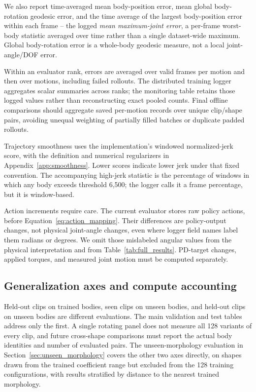 We also report time-averaged mean body-position error, mean global
body-rotation geodesic error, and the time average of the largest body-position
error within each frame -- the logged \emph{mean maximum-joint error}, a
per-frame worst-body statistic averaged over time rather than a single
dataset-wide maximum. Global body-rotation error is a whole-body geodesic
measure, not a local joint-angle/DOF error.

Within an evaluator rank, errors are averaged over valid frames per motion
and then over motions, including failed rollouts. The distributed training
logger aggregates scalar summaries across ranks; the monitoring table
retains those logged values rather than reconstructing exact pooled counts.
Final offline comparisons should aggregate saved per-motion records over
unique clip/shape pairs, avoiding unequal weighting of partially filled
batches or duplicate padded rollouts.

Trajectory smoothness uses the implementation's windowed normalized-jerk
score, with the definition and numerical regularizers in
Appendix~\ref{app:smoothness}. Lower scores indicate lower jerk under that
fixed convention. The accompanying high-jerk statistic is the percentage
of windows in which any body exceeds threshold 6,500; the logger calls it
a frame percentage, but it is window-based.

Action increments require care. The current evaluator stores raw policy
actions, before Equation~\eqref{eq:action_mapping}. Their differences are
policy-output changes, not physical joint-angle changes, even where logger
field names label them radians or degrees. We omit those mislabeled angular
values from the physical interpretation and from Table~\ref{tab:full_results}.
PD-target changes, applied torques, and measured joint motion must be
computed separately.

\subsection{Generalization axes and compute accounting}

Held-out clips on trained bodies, seen clips on unseen bodies, and held-out
clips on unseen bodies are different evaluations. The main validation and
test tables address only the first. A single rotating panel does not
measure all 128 variants of every clip, and future cross-shape comparisons
must report the actual body identities and number of evaluated pairs. The
unseen-morphology evaluation in Section~\ref{sec:unseen_morphology} covers
the other two axes directly, on shapes drawn from the trained coefficient
range but excluded from the 128 training configurations, with results
stratified by distance to the nearest trained morphology.

